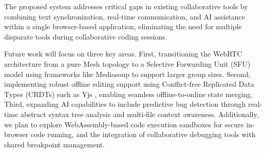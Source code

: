\documentclass[conference]{IEEEtran}
\begin{document}
The proposed system addresses critical gaps in existing collaborative tools by combining text synchronization, real-time communication, and AI assistance within a single browser-based application, eliminating the need for multiple disparate tools during collaborative coding sessions.

Future work will focus on three key areas. First, transitioning the WebRTC architecture from a pure Mesh topology to a Selective Forwarding Unit (SFU) model using frameworks like Mediasoup to support larger group sizes. Second, implementing robust offline editing support using Conflict-free Replicated Data Types (CRDTs) such as Yjs \cite{b8}, enabling seamless offline-to-online state merging. Third, expanding AI capabilities to include predictive bug detection through real-time abstract syntax tree analysis and multi-file context awareness. Additionally, we plan to explore WebAssembly-based code execution sandboxes for secure in-browser code running, and the integration of collaborative debugging tools with shared breakpoint management.
\end{document}
